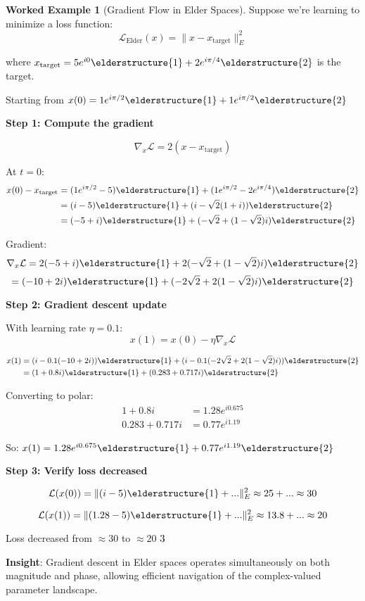 \documentclass[12pt,a4paper]{article}
\newcommand{\checkmark}{\ding{51}}
\theoremstyle{definition}
\newtheorem{example}{Worked Example}[section]
\theoremstyle{remark}
\begin{document}
\begin{example}[Gradient Flow in Elder Spaces]

Suppose we're learning to minimize a loss function:
$$\mathcal{L}_{\text{Elder}}(x) = \|x - x_{\text{target}}\|_E^2$$

where $x_{\text{target}} = 5e^{i0}\elderstructure{1} + 2e^{i\pi/4}\elderstructure{2}$ is the target.

Starting from $x(0) = 1e^{i\pi/2}\elderstructure{1} + 1e^{i\pi/2}\elderstructure{2}$

\textbf{Step 1: Compute the gradient}

$$\nabla_x \mathcal{L} = 2(x - x_{\text{target}})$$

At $t=0$:
\begin{align}
x(0) - x_{\text{target}} &= (1e^{i\pi/2} - 5)\elderstructure{1} + (1e^{i\pi/2} - 2e^{i\pi/4})\elderstructure{2} \\
&= (i - 5)\elderstructure{1} + (i - \sqrt{2}(1+i))\elderstructure{2} \\
&= (-5 + i)\elderstructure{1} + (-\sqrt{2} + (1-\sqrt{2})i)\elderstructure{2}
\end{align}

Gradient:
$$\nabla_x \mathcal{L} = 2(-5 + i)\elderstructure{1} + 2(-\sqrt{2} + (1-\sqrt{2})i)\elderstructure{2}$$
$$= (-10 + 2i)\elderstructure{1} + (-2\sqrt{2} + 2(1-\sqrt{2})i)\elderstructure{2}$$

\textbf{Step 2: Gradient descent update}

With learning rate $\eta = 0.1$:
$$x(1) = x(0) - \eta \nabla_x \mathcal{L}$$

\begin{align}
x(1) &= (i - 0.1(-10 + 2i))\elderstructure{1} + (i - 0.1(-2\sqrt{2} + 2(1-\sqrt{2})i))\elderstructure{2} \\
&= (1 + 0.8i)\elderstructure{1} + (0.283 + 0.717i)\elderstructure{2}
\end{align}

Converting to polar:
\begin{align}
1 + 0.8i &= 1.28e^{i0.675} \\
0.283 + 0.717i &= 0.77e^{i1.19}
\end{align}

So: $x(1) = 1.28e^{i0.675}\elderstructure{1} + 0.77e^{i1.19}\elderstructure{2}$

\textbf{Step 3: Verify loss decreased}

$$\mathcal{L}(x(0)) = \|(i - 5)\elderstructure{1} + \text{...}\|_E^2 \approx 25 + \text{...} \approx 30$$

$$\mathcal{L}(x(1)) = \|(1.28 - 5)\elderstructure{1} + \text{...}\|_E^2 \approx 13.8 + \text{...} \approx 20$$

Loss decreased from $\approx 30$ to $\approx 20$ $\checkmark$

\textbf{Insight}: Gradient descent in Elder spaces operates simultaneously on both magnitude and phase, allowing efficient navigation of the complex-valued parameter landscape.
\end{example}
\end{document}
